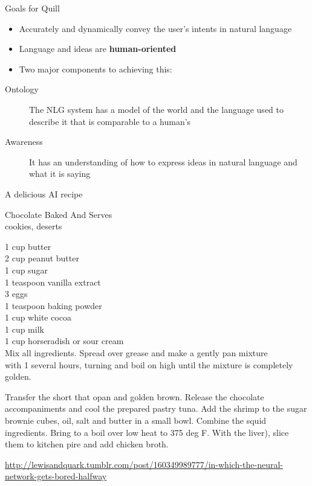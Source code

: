 \documentclass[10pt, compress]{beamer}
\begin{document}
\begin{frame}{Goals for Quill}
	\begin{itemize}
		\item Accurately and dynamically convey the user's intents in natural language 
		\item Language and ideas are \textbf{human-oriented} \pause
		\item Two major components to achieving this:
	\end{itemize}

	\begin{description}
		\item[Ontology] The NLG system has a model of the world and the language used to describe it that is comparable to a human's \pause
		\item[Awareness] It has an understanding of how to express ideas in natural language and what it is saying
	\end{description}
\end{frame}

\begin{frame}{A delicious AI recipe}

	\footnotesize
	Chocolate Baked And Serves	\\
	cookies, deserts

	1 cup butter	\\
	2 cup peanut butter	\\
	1 cup sugar \\
	1 teaspoon vanilla extract	\\
	3  eggs \\
	1 teaspoon baking powder \\
	1 cup white cocoa \\
	1 cup milk \\
	1 cup horseradish or sour cream \\

	Mix all ingredients.  Spread over grease and make a gently pan mixture \\
	with 1 several hours, turning and boil on high until the mixture is completely golden.

	Transfer the short that opan and golden brown. Release the chocolate
	accompaniments and cool the prepared pastry tuna. Add the shrimp to the sugar brownie cubes, oil, salt and butter in a small bowl. Combine the squid ingredients. Bring to a boil over low heat to 375 deg F. With the liver), slice them to kitchen pire and add chicken broth.

	{\tiny \href{http://lewisandquark.tumblr.com/post/160349989777/in-which-the-neural-network-gets-bored-halfway}{http://lewisandquark.tumblr.com/post/160349989777/in-which-the-neural-network-gets-bored-halfway}}
\end{frame}
\end{document}
